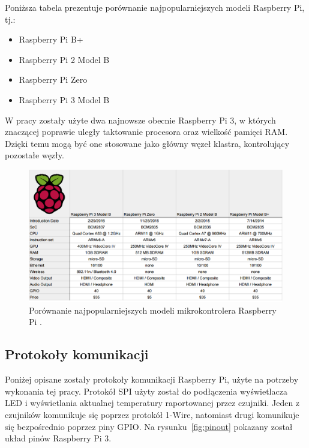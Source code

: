 \documentclass[12pt]{report}
\let\Oldsubsection\subsection
\renewcommand{\subsection}{\FloatBarrier\Oldsubsection}
\begin{document}
{\clearpage
\noindent Poniższa tabela prezentuje porównanie najpopularniejszych modeli Raspberry Pi, tj.:
\begin{itemize}
\item{Raspberry Pi B+}
\item{Raspberry Pi 2 Model B}
\item{Raspberry Pi Zero}
\item{Raspberry Pi 3 Model B}
\end{itemize}

\noindent W pracy zostały użyte dwa najnowsze obecnie Raspberry Pi 3, w których znaczącej poprawie uległy taktowanie procesora oraz wielkość pamięci RAM. Dzięki temu mogą być one stosowane jako główny węzeł klastra, kontrolujący pozostałe węzły.

\begin{figure}[h]
	\centering
	\includegraphics[width=1.05\textwidth]{images/rpiComparison.png}
	\caption{Porównanie najpopularniejszych modeli mikrokontrolera Raspberry Pi \cite{rpiComparisonImg}.}
\end{figure}

\subsection{Protokoły komunikacji}
Poniżej opisane zostały protokoły komunikacji Raspberry Pi, użyte na potrzeby wykonania tej pracy. Protokół SPI użyty został do podłączenia wyświetlacza LED i wyświetlania aktualnej temperatury raportowanej przez czujniki. Jeden z czujników komunikuje się poprzez protokół 1-Wire, natomiast drugi komunikuje się bezpośrednio poprzez piny GPIO. Na rysunku~\ref{fig:pinout} pokazany został układ pinów Raspberry Pi 3.

}
\end{document}
